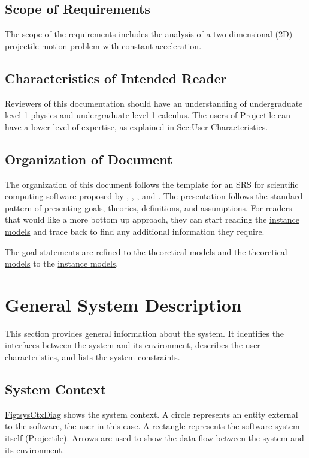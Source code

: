 \documentclass[12pt]{article}
\begin{document}
\subsection{Scope of Requirements}
\label{Sec:ReqsScope}
The scope of the requirements includes the analysis of a two-dimensional (2D) projectile motion problem with constant acceleration.

\subsection{Characteristics of Intended Reader}
\label{Sec:ReaderChars}
Reviewers of this documentation should have an understanding of undergraduate level 1 physics and undergraduate level 1 calculus. The users of Projectile can have a lower level of expertise, as explained in \hyperref[Sec:UserChars]{Sec:User Characteristics}.

\subsection{Organization of Document}
\label{Sec:DocOrg}
The organization of this document follows the template for an SRS for scientific computing software proposed by \cite{koothoor2013}, \cite{smithLai2005}, \cite{smithEtAl2007}, and \cite{smithKoothoor2016}. The presentation follows the standard pattern of presenting goals, theories, definitions, and assumptions. For readers that would like a more bottom up approach, they can start reading the \hyperref[Sec:IMs]{instance models} and trace back to find any additional information they require.

The \hyperref[Sec:GoalStmt]{goal statements} are refined to the theoretical models and the \hyperref[Sec:TMs]{theoretical models} to the \hyperref[Sec:IMs]{instance models}.

\section{General System Description}
\label{Sec:GenSysDesc}
This section provides general information about the system. It identifies the interfaces between the system and its environment, describes the user characteristics, and lists the system constraints.

\subsection{System Context}
\label{Sec:SysContext}
\hyperref[Figure:sysCtxDiag]{Fig:sysCtxDiag} shows the system context. A circle represents an entity external to the software, the user in this case. A rectangle represents the software system itself (Projectile). Arrows are used to show the data flow between the system and its environment.
\end{document}
